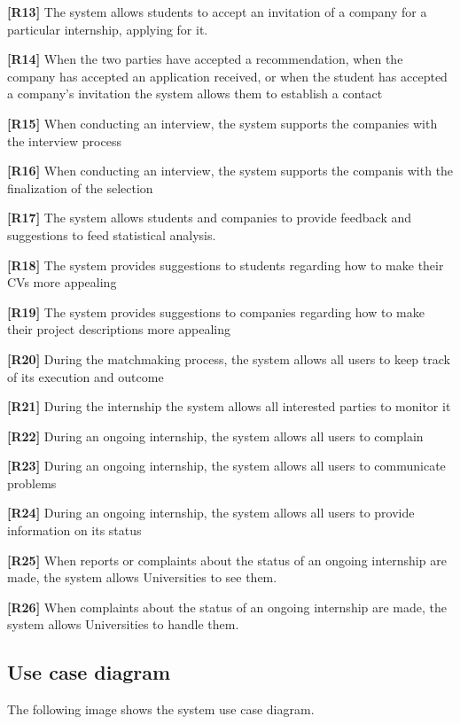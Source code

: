 \textbf{[R13]} The system allows students to accept an invitation of a company for a particular internship, applying for it.

\textbf{[R14]}  When the two parties have accepted a recommendation, when the company has accepted an application received, or when the student has accepted a company's invitation the system allows them to establish a contact

\textbf{[R15]} When conducting an interview, the system supports the companies with the interview process

\textbf{[R16]} When conducting an interview, the system supports the companis with the finalization of the selection

\textbf{[R17]} The system allows students and companies to provide feedback and suggestions to feed statistical analysis.

\textbf{[R18] }The system provides suggestions to students regarding how to make their CVs more appealing

\textbf{[R19]} The system provides suggestions to companies regarding how to make their project descriptions more appealing

\textbf{[R20]} During the matchmaking process, the system allows all users to keep track of its execution and outcome

\textbf{[R21]} During the internship the system allows all interested parties to monitor it

\textbf{[R22]} During an ongoing internship, the system allows all users to complain 

\textbf{[R23]} During an ongoing internship, the system allows all users to communicate problems 

\textbf{[R24]} During an ongoing internship, the system allows all users to provide information on its status

\textbf{[R25]} When reports or complaints about the status of an ongoing internship are made, the system allows Universities to see them.

\textbf{[R26]} When complaints about the status of an ongoing internship are made, the system allows Universities to handle them.

\pagebreak

\subsection{Use case diagram}

The following image shows the system use case diagram.

